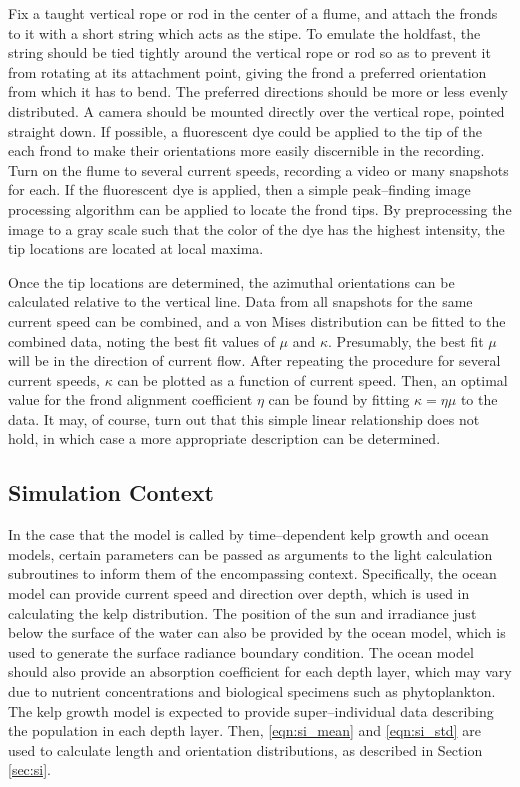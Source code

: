 Fix a taught vertical rope or rod in the center of a flume, and attach the fronds to it with a short string which acts as the stipe.
To emulate the holdfast, the string should be tied tightly around the vertical rope or rod so as to prevent it from rotating at its attachment point,
giving the frond a preferred orientation from which it has to bend.
The preferred directions should be more or less evenly distributed.
A camera should be mounted directly over the vertical rope, pointed straight down.
If possible, a fluorescent dye could be applied to the tip of the each frond to make their orientations more easily discernible in the recording.
Turn on the flume to several current speeds, recording a video or many snapshots for each.
If the fluorescent dye is applied, then a simple peak--finding image processing algorithm can be applied to locate the frond tips.
By preprocessing the image to a gray scale such that the color of the dye has the highest intensity,
the tip locations are located at local maxima.

Once the tip locations are determined, the azimuthal orientations can be calculated relative to the vertical line.
Data from all snapshots for the same current speed can be combined, and a von Mises distribution can be fitted to the combined data,
noting the best fit values of $\mu$ and $\kappa$.
Presumably, the best fit $\mu$ will be in the direction of current flow.
After repeating the procedure for several current speeds, $\kappa$ can be plotted as a function of current speed.
Then, an optimal value for the frond alignment coefficient $\eta$ can be found by fitting $\kappa = \eta\mu$ to the data.
It may, of course, turn out that this simple linear relationship does not hold, in which case a more appropriate description can be determined.

\subsection{Simulation Context}
\label{sec:simulation_context}
In the case that the model is called by time--dependent kelp growth and ocean models, certain parameters can be passed as arguments to the light calculation subroutines to inform them of the encompassing context.
Specifically, the ocean model can provide current speed and direction over depth, which is used in calculating the kelp distribution.
The position of the sun and irradiance just below the surface of the water can also be provided by the ocean model, which is used to generate the surface radiance boundary condition.
The ocean model should also provide an absorption coefficient for each depth layer, which may vary due to nutrient concentrations and biological specimens such as phytoplankton.
The kelp growth model is expected to provide super--individual data describing the population in each depth layer.
Then, \eqref{eqn:si_mean} and \eqref{eqn:si_std} are used to calculate length and orientation distributions, as described in Section \ref{sec:si}.

